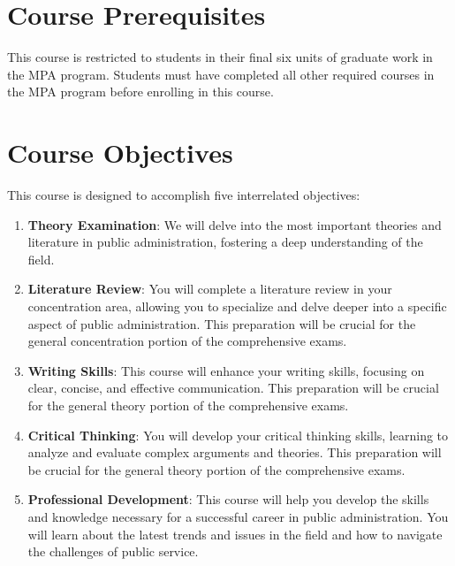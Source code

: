 \documentclass[12pt, letterpaper]{article}
\begin{document}
                    \section{Course Prerequisites}
                    This course is restricted to students in their final six units of graduate work in the MPA program. Students must have completed all other required courses in the MPA program before enrolling in this course.
                    
                    \section{Course Objectives}
                    This course is designed to accomplish five interrelated objectives:
                    
                    \begin{enumerate}
                            \item \textbf{Theory Examination}: We will delve into the most important theories and literature in public administration, fostering a deep understanding of the field.
                            \item \textbf{Literature Review}: You will complete a literature review in your concentration area, allowing you to specialize and delve deeper into a specific aspect of public administration. This preparation will be crucial for the general concentration portion of the comprehensive exams.
                            \item \textbf{Writing Skills}: This course will enhance your writing skills, focusing on clear, concise, and effective communication. This preparation will be crucial for the general theory portion of the comprehensive exams.
                            \item \textbf{Critical Thinking}: You will develop your critical thinking skills, learning to analyze and evaluate complex arguments and theories. This preparation will be crucial for the general theory portion of the comprehensive exams.
                            \item \textbf{Professional Development}: This course will help you develop the skills and knowledge necessary for a successful career in public administration. You will learn about the latest trends and issues in the field and how to navigate the challenges of public service.
                    
                    \end{enumerate}
    
\end{document}

